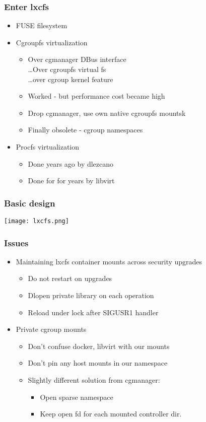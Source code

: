 \documentclass{beamer}
\begin{document}
\begin{frame}[fragile]
\frametitle{Enter lxcfs}
	\begin{itemize}
	\item FUSE filesystem
	\item Cgroupfs virtualization
		\begin{itemize}
		\item Over cgmanager DBus interface \\
			\ldots Over cgroupfs virtual fs \\
			\ldots over cgroup kernel feature
		\item Worked - but performance cost became high
		\pause
		\item Drop cgmanager, use own native cgroupfs mountsk
		\pause
		\item Finally obsolete - cgroup namespaces
		\end{itemize}
	\pause
	\item Procfs virtualization
		\begin{itemize}
		\item Done years ago by dlezcano
		\item Done for for years by libvirt
		\end{itemize}
	\end{itemize}
\end{frame}

\begin{frame}
\frametitle{Basic design}
\texttt{[image: lxcfs.png]}
\end{frame}

\begin{frame}
\frametitle{Issues}
	\begin{itemize}
	\item Maintaining lxcfs container mounts across security upgrades
		\begin{itemize}
		\item Do not restart on upgrades
		\item Dlopen private library on each operation
		\item Reload under lock after SIGUSR1 handler
		\end{itemize}
	\item Private cgroup mounts
		\begin{itemize}
		\item Don't confuse docker, libvirt with our mounts
		\item Don't pin any host mounts in our namespace
		\item Slightly different solution from cgmanager:
			\begin{itemize}
			\item Open sparse namespace
			\item Keep open fd for each mounted controller dir.
			\end{itemize}
		\end{itemize}
	\end{itemize}
\end{frame}
\end{document}
